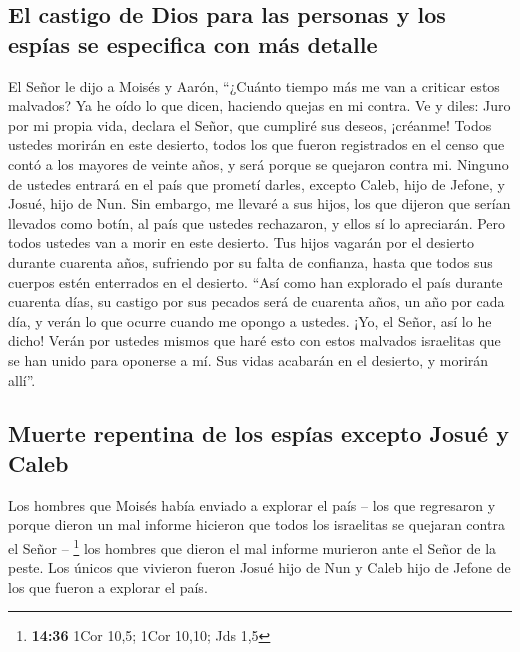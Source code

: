 \hypertarget{el-castigo-de-dios-para-las-personas-y-los-espuxedas-se-especifica-con-muxe1s-detalle}{%
\subsection{El castigo de Dios para las personas y los espías se
especifica con más
detalle}\label{el-castigo-de-dios-para-las-personas-y-los-espuxedas-se-especifica-con-muxe1s-detalle}}

 El Señor le dijo a Moisés y Aarón, 
``¿Cuánto tiempo más me van a criticar estos malvados? Ya he oído lo que
dicen, haciendo quejas en mi contra.  Ve y diles: Juro
por mi propia vida, declara el Señor, que cumpliré sus deseos, ¡créanme!
 Todos ustedes morirán en este desierto, todos los que
fueron registrados en el censo que contó a los mayores de veinte años, y
será porque se quejaron contra mi.  Ninguno de ustedes
entrará en el país que prometí darles, excepto Caleb, hijo de Jefone, y
Josué, hijo de Nun.  Sin embargo, me llevaré a sus hijos,
los que dijeron que serían llevados como botín, al país que ustedes
rechazaron, y ellos sí lo apreciarán.  Pero todos ustedes
van a morir en este desierto.  Tus hijos vagarán por el
desierto durante cuarenta años, sufriendo por su falta de confianza,
hasta que todos sus cuerpos estén enterrados en el desierto.
 ``Así como han explorado el país durante cuarenta días,
su castigo por sus pecados será de cuarenta años, un año por cada día, y
verán lo que ocurre cuando me opongo a ustedes.  ¡Yo, el
Señor, así lo he dicho! Verán por ustedes mismos que haré esto con estos
malvados israelitas que se han unido para oponerse a mí. Sus vidas
acabarán en el desierto, y morirán allí''.

\hypertarget{muerte-repentina-de-los-espuxedas-excepto-josuuxe9-y-caleb}{%
\subsection{Muerte repentina de los espías excepto Josué y
Caleb}\label{muerte-repentina-de-los-espuxedas-excepto-josuuxe9-y-caleb}}

 Los hombres que Moisés había enviado a explorar el país
-- los que regresaron y porque dieron un mal informe hicieron que todos
los israelitas se quejaran contra el Señor -- \footnote{\textbf{14:36}
  1Cor 10,5; 1Cor 10,10; Jds 1,5}  los hombres que dieron
el mal informe murieron ante el Señor de la peste.  Los
únicos que vivieron fueron Josué hijo de Nun y Caleb hijo de Jefone de
los que fueron a explorar el país.

